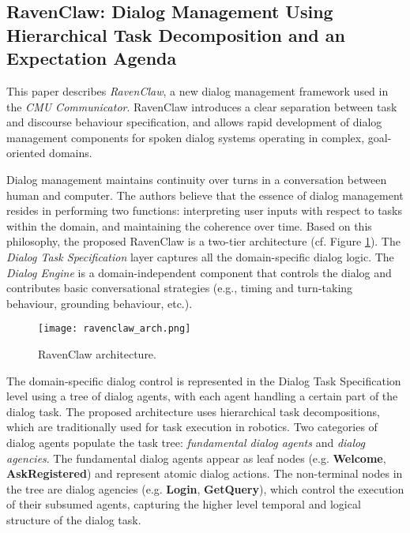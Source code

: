 \subsection{RavenClaw: Dialog Management Using Hierarchical Task Decomposition and an Expectation Agenda \cite{Bohus2003}}

This paper describes \emph{RavenClaw}, a new dialog management framework used in the \emph{CMU Communicator}. RavenClaw introduces a clear separation between task and discourse behaviour specification, and allows rapid development of dialog management components for spoken dialog systems operating in complex, goal-oriented domains.

Dialog management maintains continuity over turns in a conversation between human and computer. The authors believe that the essence of dialog management resides in performing two functions: interpreting user inputs with respect to tasks within the domain, and maintaining the coherence over time. Based on this philosophy, the proposed RavenClaw is a two-tier architecture (cf. Figure \ref{fig:raven_arch}). The \emph{Dialog Task Specification} layer captures all the domain-specific dialog logic. The \emph{Dialog Engine} is a domain-independent component that controls the dialog and contributes basic conversational strategies (e.g., timing and turn-taking behaviour, grounding behaviour, etc.).

\begin{figure}[h]
  \centering
  \texttt{[image: ravenclaw\_arch.png]}\\
  \caption{RavenClaw architecture.}\label{fig:raven_arch}
\end{figure}

The domain-specific dialog control is represented in the Dialog Task Specification level using a tree of dialog agents, with each agent handling a certain part of the dialog task. The proposed architecture uses hierarchical task decompositions, which are traditionally used for task execution in robotics. Two categories of dialog agents populate the task tree: \emph{fundamental dialog agents} and \emph{dialog agencies}. The fundamental dialog agents appear as leaf nodes (e.g. \textbf{Welcome}, \textbf{AskRegistered}) and represent atomic dialog actions. The non-terminal nodes in the tree are dialog agencies (e.g. \textbf{Login}, \textbf{GetQuery}), which control the execution of their subsumed agents, capturing the higher level temporal and logical structure of the dialog task.

